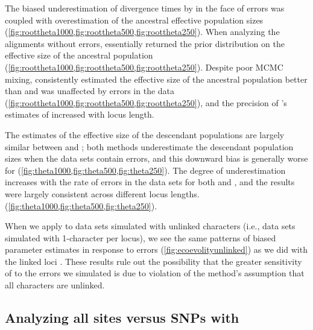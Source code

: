 The biased underestimation of divergence times by \ecoevolity in the face of
errors was coupled with overestimation of the ancestral effective population
sizes (\cref{fig:roottheta1000,fig:roottheta500,fig:roottheta250}).
When analyzing the alignments without errors, \ecoevolity essentially returned
the prior distribution on the effective size of the ancestral population
(\cref{fig:roottheta1000,fig:roottheta500,fig:roottheta250}).
Despite poor MCMC mixing,
\beast consistently estimated the effective size of
the ancestral population better than \ecoevolity and was unaffected by errors
in the data
(\cref{fig:roottheta1000,fig:roottheta500,fig:roottheta250}),
and the precision of \beast{}'s estimates of \rootpopsize increased with locus
length.

The estimates of the effective size of the descendant populations
are largely similar between \beast and \ecoevolity;
both methods underestimate the descendant population sizes when
the data sets contain errors, and this downward bias is generally
worse for \ecoevolity
(\cref{fig:theta1000,fig:theta500,fig:theta250}).
The degree of underestimation increases with the rate of errors in the data
sets for both \beast and \ecoevolity, and the results were largely consistent
across different locus lengths.
(\cref{fig:theta1000,fig:theta500,fig:theta250}).

When we apply \ecoevolity to data sets simulated with unlinked characters
(i.e., data sets simulated with 1-character per locus),
we see the same patterns of biased parameter estimates
in response to errors
(\cref{fig:ecoevolityunlinked})
as we did with the linked loci \timefigsp.
These results rule out the possibility that the greater sensitivity of
\ecoevolity to the errors we simulated is due to  violation of the method's
assumption that all characters are unlinked.

\subsection{Analyzing all sites versus SNPs with \ecoevolity}

